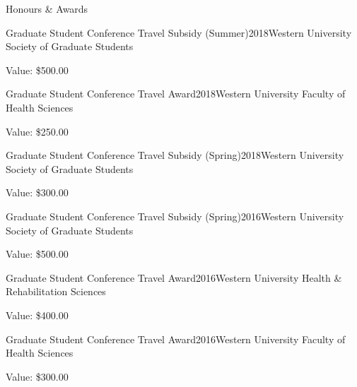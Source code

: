 \documentclass{resume} %
\begin{document}
\begin{rSection}{Honours \& Awards}
\begin{rSubsection}{Graduate Student Conference Travel Subsidy (Summer)}{2018}{Western University Society of Graduate Students}{}
	\item Value: \$500.00
\end{rSubsection}

\begin{rSubsection}{Graduate Student Conference Travel Award}{2018}{Western University Faculty of Health Sciences}{}
	\item Value: \$250.00
\end{rSubsection}

\begin{rSubsection}{Graduate Student Conference Travel Subsidy (Spring)}{2018}{Western University Society of Graduate Students}{}
	\item Value: \$300.00
\end{rSubsection}

\begin{rSubsection}{Graduate Student Conference Travel Subsidy (Spring)}{2016}{Western University Society of Graduate Students}{}
	\item Value: \$500.00
\end{rSubsection}

\begin{rSubsection}{Graduate Student Conference Travel Award}{2016}{Western University Health \& Rehabilitation Sciences}{}
	\item Value: \$400.00
\end{rSubsection}

\begin{rSubsection}{Graduate Student Conference Travel Award}{2016}{Western University Faculty of Health Sciences}{}
	\item Value: \$300.00
\end{rSubsection}



%


\end{rSection}


\end{document}
